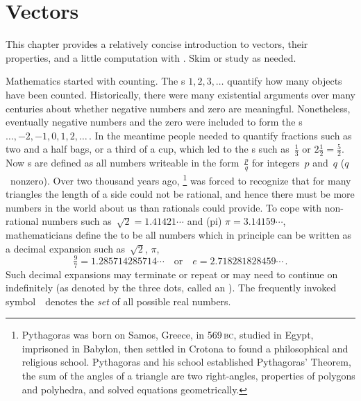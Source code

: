 
\chapter{Vectors}
\label{ch:v}

\minitoc

\begin{comment}
Introduce vectors, lines, and planes, including adapting material from parts of Chapter~1 \pooliv{pp.1--55}, Chapter~2 (pre-\S2.1) of the book by \cite{Hopcroft2014},  \holti{\S2.1}, \larsvii{\S4.1} (short), et al.
Also Chapter~13 by \cite{HughesHallett2013}.
\end{comment}

This chapter provides a relatively concise introduction to vectors, their properties, and a little computation with \script.  
Skim or study as needed.


Mathematics started with counting.
The s \(1,2,3,\ldots\) quantify how many objects have been counted.
Historically, there were many existential arguments over many centuries about whether negative numbers and zero are meaningful.
Nonetheless, eventually negative numbers and the zero were included to form the s \(\ldots,-2,-1,0,1,2,\ldots\)\,.
In the meantime people needed to quantify fractions such as two and a 
half bags, or a third of a cup, which led to the s such as~\(\tfrac13\) or \(2\tfrac12=\tfrac52\). 
Now s are defined as all numbers writeable in the form~\(\tfrac pq\) for integers~\(p\) and~\(q\) (\(q\)~nonzero).
Over two thousand years ago, %
\footnote{Pythagoras was born on Samos, Greece, in 569\,\textsc{bc}, studied in Egypt, imprisoned in Babylon, then settled in Crotona to found a philosophical and religious school.  Pythagoras and his school established Pythagoras' Theorem, the sum of the angles of a triangle are two right-angles, properties of polygons and polyhedra, and solved equations geometrically.}
was forced to recognize that for many triangles the length of a side could not be rational, and hence there must be more numbers in the world about us than rationals could provide.
To cope with non-rational numbers such as~\(\sqrt2=1.41421\cdots\) and (pi) \(\pi=3.14159\cdots\), mathematicians define the  to be all numbers which in principle can be written as a decimal expansion such as~\(\sqrt2\), \(\pi\),
\begin{equation*}
\tfrac97=1.285714285714\cdots
\quad\text{or}\quad
e=2.718281828459\cdots\,.
\end{equation*}
Such decimal expansions may terminate or repeat or may need to continue on indefinitely (as denoted by the three dots, called an ).
The frequently invoked symbol~\RR\ denotes the \emph{set} of all possible real numbers.

